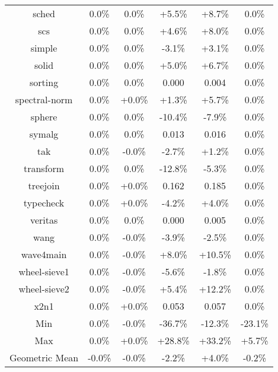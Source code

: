 \begin{tabular}{ c c c c c c }
sched &  0.0\% &  0.0\% & +5.5\% & +8.7\% &  0.0\%\\
scs &  0.0\% &  0.0\% & +4.6\% & +8.0\% &  0.0\%\\
simple &  0.0\% &  0.0\% & -3.1\% & +3.1\% &  0.0\%\\
solid &  0.0\% &  0.0\% & +5.0\% & +6.7\% &  0.0\%\\
sorting &  0.0\% &  0.0\% & 0.000 & 0.004 &  0.0\%\\
spectral-norm &  0.0\% & +0.0\% & +1.3\% & +5.7\% &  0.0\%\\
sphere &  0.0\% &  0.0\% & -10.4\% & -7.9\% &  0.0\%\\
symalg &  0.0\% &  0.0\% & 0.013 & 0.016 &  0.0\%\\
tak &  0.0\% & -0.0\% & -2.7\% & +1.2\% &  0.0\%\\
transform &  0.0\% &  0.0\% & -12.8\% & -5.3\% &  0.0\%\\
treejoin &  0.0\% & +0.0\% & 0.162 & 0.185 &  0.0\%\\
typecheck &  0.0\% & +0.0\% & -4.2\% & +4.0\% &  0.0\%\\
veritas &  0.0\% &  0.0\% & 0.000 & 0.005 &  0.0\%\\
wang &  0.0\% & -0.0\% & -3.9\% & -2.5\% &  0.0\%\\
wave4main &  0.0\% & -0.0\% & +8.0\% & +10.5\% &  0.0\%\\
wheel-sieve1 &  0.0\% & -0.0\% & -5.6\% & -1.8\% &  0.0\%\\
wheel-sieve2 &  0.0\% & -0.0\% & +5.4\% & +12.2\% &  0.0\%\\
x2n1 &  0.0\% & +0.0\% & 0.053 & 0.057 &  0.0\%\\
\hline
Min &  0.0\% & -0.0\% & -36.7\% & -12.3\% & -23.1\%\\
Max &  0.0\% & +0.0\% & +28.8\% & +33.2\% & +5.7\%\\
Geometric Mean & -0.0\% & -0.0\% & -2.2\% & +4.0\% & -0.2\%\\


\end{tabular}
